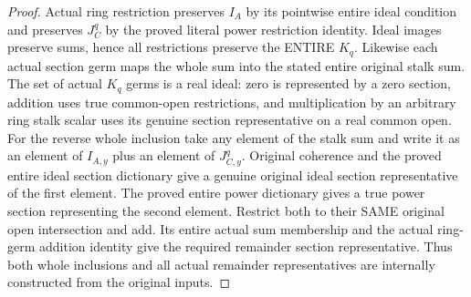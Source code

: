 \begin{proof}
Actual ring restriction preserves $I_A$ by its pointwise entire ideal
condition and preserves $J_C^q$ by the proved literal power restriction
identity. Ideal images preserve sums, hence all restrictions preserve the
ENTIRE $K_q$. Likewise each actual section germ maps the whole sum into
the stated entire original stalk sum. The set of actual $K_q$ germs is
a real ideal: zero is represented by a zero section, addition uses true
common-open restrictions, and multiplication by an arbitrary ring stalk
scalar uses its genuine section representative on a real common open.
For the reverse whole inclusion take any element of the stalk sum and
write it as an element of $I_{A,y}$ plus an element of $J_{C,y}^q$.
Original coherence and the proved entire ideal section dictionary give
a genuine original ideal section representative of the first element.
The proved entire power dictionary gives a true power section representing
the second element. Restrict both to their SAME original open intersection
and add. Its entire actual sum membership and the actual ring-germ addition
identity give the required remainder section representative. Thus both
whole inclusions and all actual remainder representatives are internally
constructed from the original inputs.
\end{proof}


